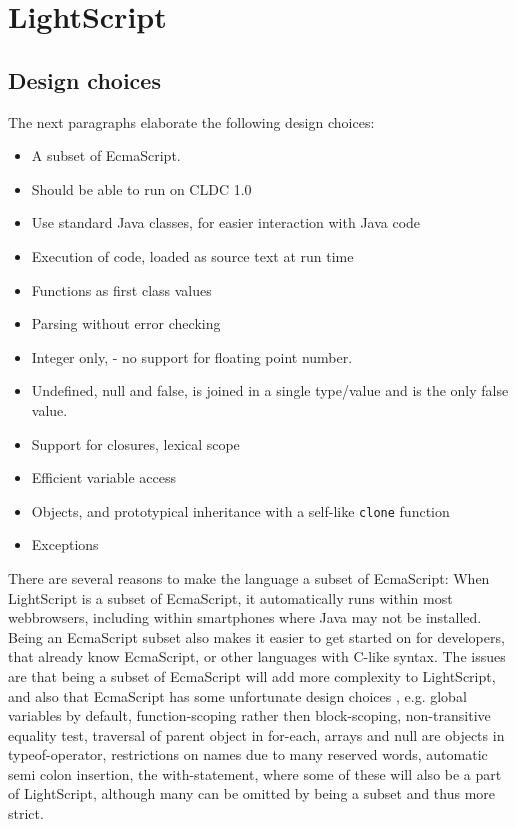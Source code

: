 \documentclass[11pt]{report}
\begin{document}
\chapter{LightScript}
\label{lightscript}
\section{Design choices}
The next paragraphs elaborate the following design choices:
\begin{itemize}
\item A subset of EcmaScript.
\item Should be able to run on CLDC 1.0
\item Use standard Java classes, for easier interaction with Java code
\item Execution of code, loaded as source text at run time
\item Functions as first class values
\item Parsing without error checking
\item Integer only, - no support for floating point number.
\item Undefined, null and false, is joined in a single type/value and is the only false value.
\item Support for closures, lexical scope
\item Efficient variable access
\item Objects, and prototypical inheritance with a self-like \verb|clone| function
\item Exceptions
\end{itemize}

There are several reasons to make the language a subset of EcmaScript:
When LightScript is a subset of EcmaScript, it automatically runs within most webbrowsers, including within smartphones where Java may not be installed.
Being an EcmaScript subset also makes it easier to get started on for developers, that already know EcmaScript, or other languages with C-like syntax.
The issues are that being a subset of EcmaScript will add more complexity to LightScript, and also that EcmaScript has some unfortunate design choices \cite{crockford-web}, e.g. global variables by default, function-scoping rather then block-scoping, non-transitive equality test, traversal of parent object in for-each, arrays and null are objects in typeof-operator, restrictions on names due to many reserved words, automatic semi colon insertion, the with-statement, 
where some of these will also be a part of LightScript,
although many can be omitted by being a subset and thus more strict. 
\end{document}
